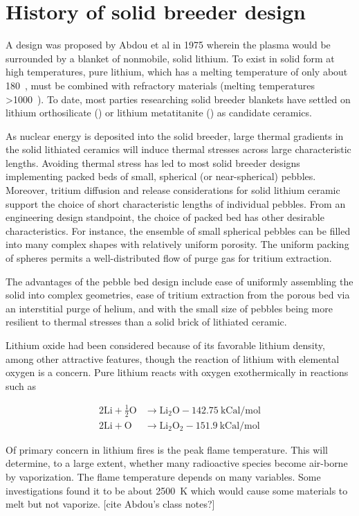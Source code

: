 \chapter{History of solid breeder design}\label{sec:solid-breeder-history}
A design was proposed by Abdou et al\cite{Abdou1974d} in 1975 wherein the plasma would be surrounded by a blanket of nonmobile, solid lithium. To exist in solid form at high temperatures, pure lithium, which has a melting temperature of only about 180~\celsius, must be combined with refractory materials (melting temperatures >1000~\celsius). To date, most parties researching solid breeder blankets have settled on lithium orthosilicate (\lis) or lithium metatitanite (\lit) as candidate ceramics.

As nuclear energy is deposited into the solid breeder, large thermal gradients in the solid lithiated ceramics will induce thermal stresses across large characteristic lengths. Avoiding thermal stress has led to most solid breeder designs implementing packed beds of small, spherical (or near-spherical) pebbles.\cite{Lulewicz2002, Mandal2012a, Tsuchiya1998, Cho2012} Moreover, tritium diffusion and release considerations for solid lithium ceramic support the choice of short characteristic lengths of individual pebbles. From an engineering design standpoint, the choice of packed bed has other desirable characteristics. For instance, the ensemble of small spherical pebbles can be filled into many complex shapes with relatively uniform porosity. The uniform packing of spheres permits a well-distributed flow of purge gas for tritium extraction. 

The advantages of the pebble bed design include ease of uniformly assembling the solid into complex geometries, ease of tritium extraction from the porous bed via an interstitial purge of helium, and with the small size of pebbles being more resilient to thermal stresses than a solid brick of lithiated ceramic.\cite{Casadio2004} 


Lithium oxide had been considered because of its favorable lithium density, among other attractive features, though the reaction of lithium with elemental oxygen is a concern. Pure lithium reacts with oxygen exothermically in reactions such as

\begin{subequations}
\begin{align}
	2\mathrm{Li} + \frac{1}{2}\mathrm{O} &\rightarrow \mathrm{Li}_2\mathrm{O} - 142.75~\text{kCal/mol}\\
	2\mathrm{Li} + \mathrm{O} &\rightarrow \mathrm{Li}_2\mathrm{O}_2 - 151.9~\text{kCal/mol}
\end{align}
\end{subequations}

Of primary concern in lithium fires is the peak flame temperature. This will determine, to a large extent, whether many radioactive species become air-borne by vaporization. The flame temperature depends on many variables. Some investigations found it to be about 2500~K which would cause some materials to melt but not vaporize. [cite Abdou's class notes?]